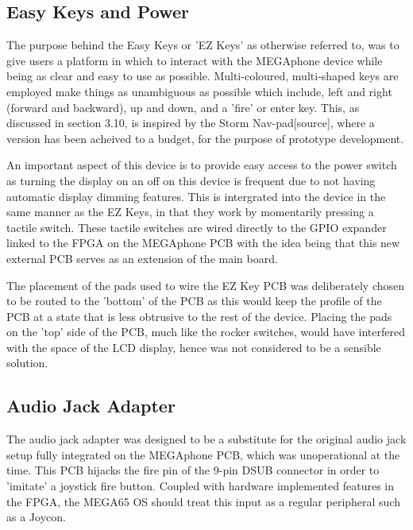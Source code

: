 \subsection{Easy Keys and Power}

The purpose behind the Easy Keys or 'EZ Keys' as otherwise referred to, was to give users a platform in which to interact with the MEGAphone device while being as clear and easy to use as possible.
Multi-coloured, multi-shaped keys are employed make things as unambiguous as possible which include, left and right (forward and backward), up and down, and a 'fire' or enter key.
This, as discussed in section 3.10, is inspired by the Storm Nav-pad[source], where a version has been acheived to a budget, for the purpose of prototype development. %

An important aspect of this device is to provide easy access to the power switch as turning the display on an off on this device is frequent due to not having automatic display dimming features.
This is intergrated into the device in the same manner as the EZ Keys, in that they work by momentarily pressing a tactile switch.
These tactile switches are wired directly to the GPIO expander linked to the FPGA on the MEGAphone PCB with the idea being that this new external PCB serves as an extension of the main board.

The placement of the pads used to wire the EZ Key PCB was deliberately chosen to be routed to the 'bottom' of the PCB as this would keep the profile of the PCB at a state that is less obtrusive to the rest of the device.
Placing the pads on the 'top' side of the PCB, much like the rocker switches, would have interfered with the space of the LCD display, hence was not considered to be a sensible solution.

\subsection{Audio Jack Adapter}

The audio jack adapter was designed to be a substitute for the original audio jack setup fully integrated on the MEGAphone PCB, which was unoperational at the time.
This PCB hijacks the fire pin of the 9-pin DSUB connector in order to 'imitate' a joystick fire button. 
Coupled with hardware implemented features in the FPGA, the MEGA65 OS should treat this input as a regular peripheral such as a Joycon.

